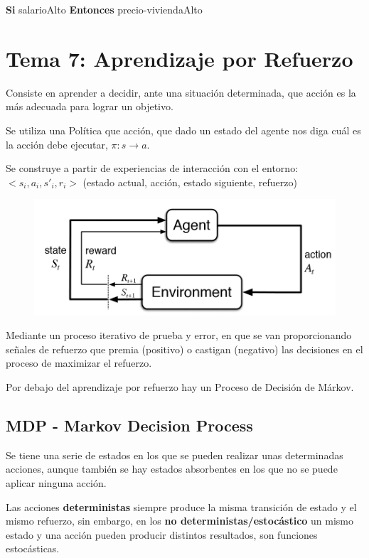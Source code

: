 \documentclass[12pt, twoside, openright]{report} %
\begin{document}
\textbf{Si} salarioAlto \textbf{Entonces} precio-viviendaAlto

\chapter{Tema 7: Aprendizaje por Refuerzo}
Consiste en aprender a decidir, ante una situación determinada, que acción es la más adecuada para lograr un objetivo.

Se utiliza una Política que acción, que dado un estado del agente nos diga cuál es la acción debe ejecutar, $\pi: s \rightarrow a$.

Se construye a partir de experiencias de interacción con el entorno: $<s_i, a_i, s'_i, r_i>$ (estado actual, acción, estado siguiente, refuerzo)
\begin{figure}[H]
	{\includegraphics[scale=.3]{default.jpg}}
\end{figure}

Mediante un proceso iterativo de prueba y error, en que se van proporcionando señales de refuerzo que premia (positivo) o castigan (negativo) las decisiones en el proceso de maximizar el refuerzo.

Por debajo del aprendizaje por refuerzo hay un Proceso de Decisión de Márkov.

\section{MDP - Markov Decision Process}

Se tiene una serie de estados en los que se pueden realizar unas determinadas acciones, aunque también se hay estados absorbentes en los que no se puede aplicar ninguna acción.

Las acciones \textbf{deterministas} siempre produce la misma transición de estado y el mismo refuerzo, sin embargo, en los \textbf{no deterministas/estocástico} un mismo estado y una acción pueden producir distintos resultados, son funciones estocásticas.
\end{document}
